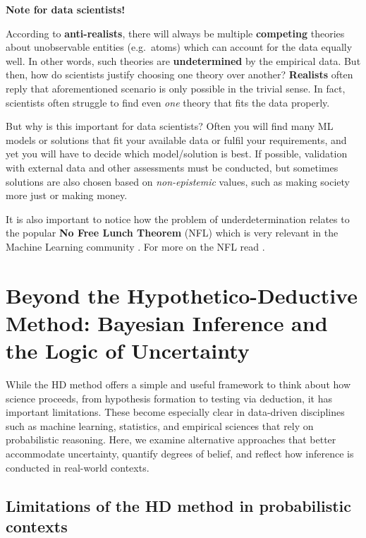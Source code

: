 \documentclass[
  12pt,
]{book}
\begin{document}
\begin{tipbox}

\textbf{Note for data scientists!}

According to \textbf{anti-realists}, there will always be multiple \textbf{competing} theories about unobservable entities (e.g.~atoms) which can account for the data equally well. In other words, such theories are \textbf{undetermined} by the empirical data. But then, how do scientists justify choosing one theory over another? \textbf{Realists} often reply that aforementioned scenario is only possible in the trivial sense. In fact, scientists often struggle to find even \emph{one} theory that fits the data properly.

But why is this important for data scientists? Often you will find many ML models or solutions that fit your available data or fulfil your requirements, and yet you will have to decide which model/solution is best. If possible, validation with external data and other assessments must be conducted, but sometimes solutions are also chosen based on \emph{non-epistemic} values, such as making society more just or making money.

It is also important to notice how the problem of underdetermination relates to the popular \textbf{No Free Lunch Theorem} (NFL) which is very relevant in the Machine Learning community \citep{dotan2020theory}. For more on the NFL read \citep{domingos2015master}.

\end{tipbox}

\section{Beyond the Hypothetico-Deductive Method: Bayesian Inference and the Logic of Uncertainty}\label{bayesian-inference}

While the HD method offers a simple and useful framework to think about how science proceeds, from hypothesis formation to testing via deduction, it has important limitations. These become especially clear in data-driven disciplines such as machine learning, statistics, and empirical sciences that rely on probabilistic reasoning. Here, we examine alternative approaches that better accommodate uncertainty, quantify degrees of belief, and reflect how inference is conducted in real-world contexts.

\subsection{Limitations of the HD method in probabilistic contexts}\label{limitations-of-the-hd-method-in-probabilistic-contexts}
\end{document}
